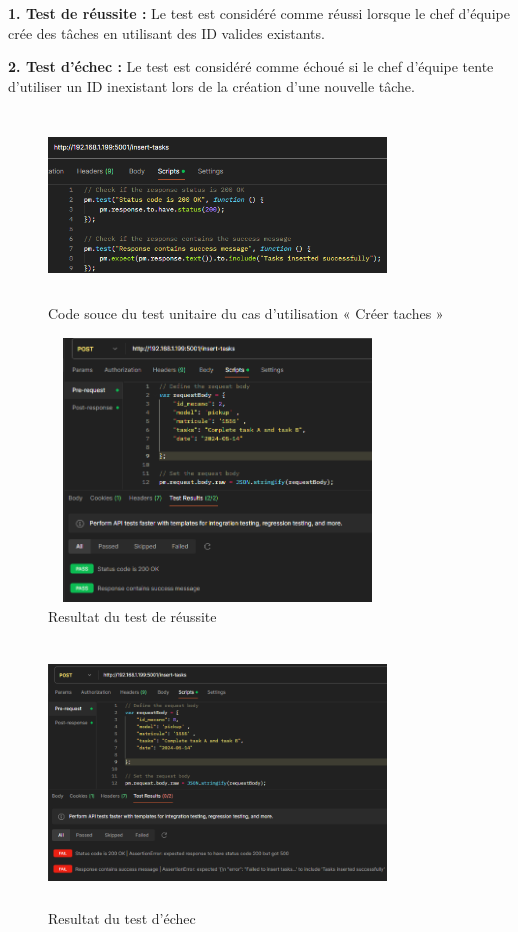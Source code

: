 \textbf{1. Test de réussite :} Le test est considéré comme réussi lorsque le chef d'équipe crée des tâches en utilisant des ID valides existants.

\textbf{2. Test d'échec :} Le test est considéré comme échoué si le chef d'équipe tente d'utiliser un ID inexistant lors de la création d'une nouvelle tâche.

\bigskip

\begin{figure}[h!]
  \centering
  \includegraphics[width=0.8\textwidth, height=5cm]{chap4.images/source test.png}
  \caption{ Code souce du test unitaire du cas d’utilisation « Créer taches » }

\end{figure}

\bigskip

\begin{figure}[h!]
  \centering
  \includegraphics[width=0.8\textwidth, height=7cm]{chap4.images/reussite.png}
  \caption{ Resultat du test de réussite}

\end{figure}
\newpage
\begin{figure}[h!]
  \centering
  \includegraphics[width=0.8\textwidth, height=7cm]{chap4.images/echec.png}
  \caption{ Resultat du test d'échec }

\end{figure}


